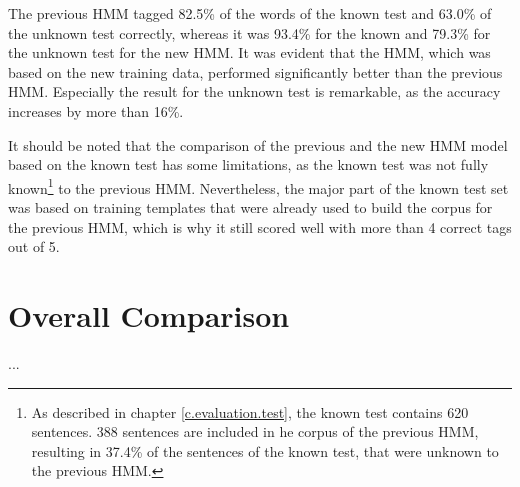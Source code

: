 The previous HMM tagged 82.5\% of the words of the known test and 63.0\% of the unknown test correctly, whereas it was 93.4\% for the known and 79.3\% for the unknown test for the new HMM. It was evident that the HMM, which was based on the new training data, performed significantly better than the previous HMM. Especially the result for the unknown test is remarkable, as the accuracy increases by more than 16\%.

It should be noted that the comparison of the previous and the new HMM model based on the known test has some limitations, as the known test was not fully known\footnote{As described in chapter \ref{c.evaluation.test}, the known test contains 620 sentences. 388 sentences are included in he corpus of the previous HMM, resulting in 37.4\% of the sentences of the known test, that were unknown to the previous HMM.} to the previous HMM. Nevertheless, the major part of the known test set was based on training templates that were already used to build the corpus for the previous HMM, which is why it still scored well with more than 4 correct tags out of 5.

\section{Overall Comparison}\label{c.evaluation.comparison}
...

